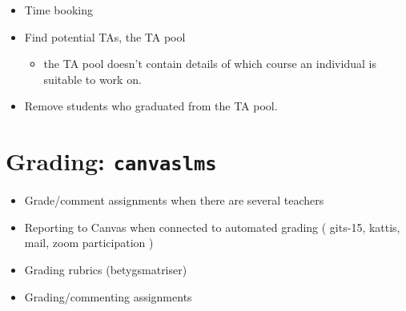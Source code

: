 \begin{frame}[fragile]\label<2>{WishTA}
  \begin{example}
    \begin{itemize}
      \item \alert<2>{Time booking}

      \item \alert<2>{Find potential TAs, the TA pool}
        \begin{itemize}
          \item \alert<2>{the TA pool doesn't contain details of which course 
            an individual is suitable to work on.}
        \end{itemize}

      \item \alert<2>{Remove students who graduated from the TA pool.}
    \end{itemize}
  \end{example}
\end{frame}


\section[Grading]{Grading: \texttt{canvaslms}}

\begin{frame}[fragile]
  \begin{example}[Grading]
    \begin{itemize}
      \item Grade/comment assignments when there are several teachers
      \item \alert{Reporting to Canvas when connected to automated grading (\eg 
        gits-15, kattis, mail, zoom participation \etc)}
      \item Grading rubrics (betygsmatriser)
      \item \alert{Grading/commenting assignments}
    \end{itemize}
  \end{example}
\end{frame}

